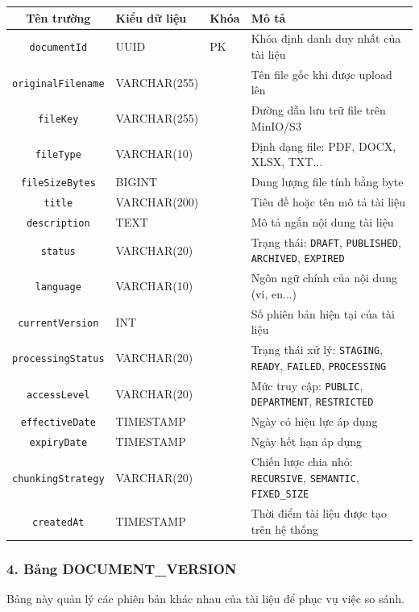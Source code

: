 \documentclass[12pt,a4paper]{report}
\begin{document}
\begin{table}[H]
\centering
\begin{tabularx}{\textwidth}{|c|l|l|X|}
\hline
\rowcolor{gray!10}
Tên trường & Kiểu dữ liệu & Khóa & Mô tả \\ \hline
\texttt{documentId} & UUID & PK & Khóa định danh duy nhất của tài liệu \\ \hline
\texttt{originalFilename} & VARCHAR(255) &  & Tên file gốc khi được upload lên \\ \hline
\texttt{fileKey} & VARCHAR(255) &  & Đường dẫn lưu trữ file trên MinIO/S3 \\ \hline
\texttt{fileType} & VARCHAR(10) &  & Định dạng file: PDF, DOCX, XLSX, TXT... \\ \hline
\texttt{fileSizeBytes} & BIGINT &  & Dung lượng file tính bằng byte \\ \hline
\texttt{title} & VARCHAR(200) &  & Tiêu đề hoặc tên mô tả tài liệu \\ \hline
\texttt{description} & TEXT &  & Mô tả ngắn nội dung tài liệu \\ \hline
\texttt{status} & VARCHAR(20) &  & Trạng thái: \texttt{DRAFT}, \texttt{PUBLISHED}, \texttt{ARCHIVED}, \texttt{EXPIRED} \\ \hline
\texttt{language} & VARCHAR(10) &  & Ngôn ngữ chính của nội dung (vi, en...) \\ \hline
\texttt{currentVersion} & INT &  & Số phiên bản hiện tại của tài liệu \\ \hline
\texttt{processingStatus} & VARCHAR(20) &  & Trạng thái xử lý: \texttt{STAGING}, \texttt{READY}, \texttt{FAILED}, \texttt{PROCESSING} \\ \hline
\texttt{accessLevel} & VARCHAR(20) &  & Mức truy cập: \texttt{PUBLIC}, \texttt{DEPARTMENT}, \texttt{RESTRICTED} \\ \hline
\texttt{effectiveDate} & TIMESTAMP &  & Ngày có hiệu lực áp dụng \\ \hline
\texttt{expiryDate} & TIMESTAMP &  & Ngày hết hạn áp dụng \\ \hline
\texttt{chunkingStrategy} & VARCHAR(20) &  & Chiến lược chia nhỏ: \texttt{RECURSIVE}, \texttt{SEMANTIC}, \texttt{FIXED\_SIZE} \\ \hline
\texttt{createdAt} & TIMESTAMP &  & Thời điểm tài liệu được tạo trên hệ thống \\ \hline
\end{tabularx}
\end{table}

\subsubsection{4. Bảng DOCUMENT\_VERSION}
Bảng này quản lý các phiên bản khác nhau của tài liệu để phục vụ việc so sánh.
\end{document}
